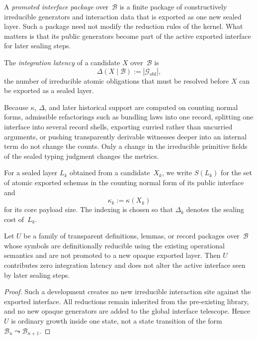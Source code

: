 \documentclass{lmcs}
\newcommand{\B}{\mathcal{B}}
\newcommand{\Gcal}{\mathcal{G}}
\begin{document}
\begin{defi}
\label{def:promoted}
A \emph{promoted interface package} over~$\B$ is a finite package of constructively irreducible generators and interaction data that is exported as one new sealed layer. Such a package need not modify the reduction rules of the kernel. What matters is that its public generators become part of the active exported interface for later sealing steps.
\end{defi}

\begin{defi}
\label{def:latency}
The \emph{integration latency} of a candidate $X$ over~$\B$ is
\[
  \Delta(X \mid \B) := |\Gcal_{\mathrm{obl}}|,
\]
the number of irreducible atomic obligations that must be resolved before $X$ can be exported as a sealed layer.
\end{defi}

\begin{rem}
\label{rem:refactor-invariance}
Because $\kappa$, $\Delta$, and later historical support are computed on counting normal forms, admissible refactorings such as bundling laws into one record, splitting one interface into several record shells, exporting curried rather than uncurried arguments, or pushing transparently derivable witnesses deeper into an internal term do not change the counts. Only a change in the irreducible primitive fields of the sealed typing judgment changes the metrics.
\end{rem}

For a sealed layer $L_k$ obtained from a candidate~$X_k$, we write $S(L_k)$ for the set of atomic exported schemas in the counting normal form of its public interface and
\[
  \kappa_k := \kappa(X_k)
\]
for its core payload size. The indexing is chosen so that $\Delta_k$ denotes the sealing cost of~$L_k$.

\begin{prop}
\label{prop:transparent}
Let $U$ be a family of transparent definitions, lemmas, or record packages over~$\B$ whose symbols are definitionally reducible using the existing operational semantics and are not promoted to a new opaque exported layer. Then $U$ contributes zero integration latency and does not alter the active interface seen by later sealing steps.
\end{prop}

\begin{proof}
Such a development creates no new irreducible interaction site against the exported interface. All reductions remain inherited from the pre-existing library, and no new opaque generators are added to the global interface telescope. Hence $U$ is ordinary growth inside one state, not a state transition of the form $\B_n \leadsto \B_{n+1}$.
\end{proof}
\end{document}
